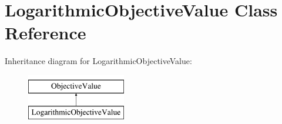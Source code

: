 \hypertarget{classLogarithmicObjectiveValue}{\section{Logarithmic\-Objective\-Value Class Reference}
\label{classLogarithmicObjectiveValue}
}
Inheritance diagram for Logarithmic\-Objective\-Value\-:\begin{figure}[H]
\begin{center}
\leavevmode
\includegraphics[height=2.000000cm]{classLogarithmicObjectiveValue}
\end{center}
\end{figure}
